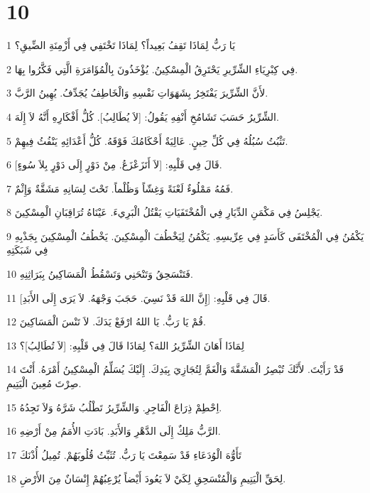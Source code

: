 \chapter{10}

\par 1 يَا رَبُّ لِمَاذَا تَقِفُ بَعِيداً؟ لِمَاذَا تَخْتَفِي فِي أَزْمِنَةِ الضِّيقِ؟
\par 2 فِي كِبْرِيَاءِ الشِّرِّيرِ يَحْتَرِقُ الْمِسْكِينُ. يُؤْخَذُونَ بِالْمُؤَامَرَةِ الَّتِي فَكَّرُوا بِهَا.
\par 3 لأَنَّ الشِّرِّيرَ يَفْتَخِرُ بِشَهَوَاتِ نَفْسِهِ وَالْخَاطِفُ يُجَدِّفُ. يُهِينُ الرَّبَّ.
\par 4 الشِّرِّيرُ حَسَبَ تَشَامُخِ أَنْفِهِ يَقُولُ: [لاَ يُطَالِبُ]. كُلُّ أَفْكَارِهِ أَنَّهُ لاَ إِلَهَ.
\par 5 تَثْبُتُ سُبُلُهُ فِي كُلِّ حِينٍ. عَالِيَةٌ أَحْكَامُكَ فَوْقَهُ. كُلُّ أَعْدَائِهِ يَنْفُثُ فِيهِمْ.
\par 6 قَالَ فِي قَلْبِهِ: [لاَ أَتَزَعْزَعُ. مِنْ دَوْرٍ إِلَى دَوْرٍ بِلاَ سُوءٍ].
\par 7 فَمُهُ مَمْلُوءٌ لَعْنَةً وَغِشّاً وَظُلْماً. تَحْتَ لِسَانِهِ مَشَقَّةٌ وَإِثْمٌ.
\par 8 يَجْلِسُ فِي مَكْمَنِ الدِّيَارِ فِي الْمُخْتَفَيَاتِ يَقْتُلُ الْبَرِيءَ. عَيْنَاهُ تُرَاقِبَانِ الْمِسْكِينَ.
\par 9 يَكْمُنُ فِي الْمُخْتَفَى كَأَسَدٍ فِي عِرِّيسِهِ. يَكْمُنُ لِيَخْطُفَ الْمِسْكِينَ. يَخْطُفُ الْمِسْكِينَ بِجَذْبِهِ فِي شَبَكَتِهِ
\par 10 فَتَنْسَحِقُ وَتَنْحَنِي وَتَسْقُطُ الْمَسَاكِينُ بِبَرَاثِنِهِ.
\par 11 قَالَ فِي قَلْبِهِ: [إِنَّ اللهَ قَدْ نَسِيَ. حَجَبَ وَجْهَهُ. لاَ يَرَى إِلَى الأَبَدِ].
\par 12 قُمْ يَا رَبُّ. يَا اللهُ ارْفَعْ يَدَكَ. لاَ تَنْسَ الْمَسَاكِينَ.
\par 13 لِمَاذَا أَهَانَ الشِّرِّيرُ اللهَ؟ لِمَاذَا قَالَ فِي قَلْبِهِ: [لاَ تُطَالِبُ]؟
\par 14 قَدْ رَأَيْتَ. لأَنَّكَ تُبْصِرُ الْمَشَقَّةَ وَالْغَمَّ لِتُجَازِيَ بِيَدِكَ. إِلَيْكَ يُسَلِّمُ الْمِسْكِينُ أَمْرَهُ. أَنْتَ صِرْتَ مُعِينَ الْيَتِيمِ.
\par 15 اِحْطِمْ ذِرَاعَ الْفَاجِرِ. وَالشِّرِّيرُ تَطْلُبُ شَرَّهُ وَلاَ تَجِدُهُ.
\par 16 الرَّبُّ مَلِكٌ إِلَى الدَّهْرِ وَالأَبَدِ. بَادَتِ الأُمَمُ مِنْ أَرْضِهِ.
\par 17 تَأَوُّهَ الْوُدَعَاءِ قَدْ سَمِعْتَ يَا رَبُّ. تُثَبِّتُ قُلُوبَهُمْ. تُمِيلُ أُذْنَكَ
\par 18 لِحَقِّ الْيَتِيمِ وَالْمُنْسَحِقِ لِكَيْ لاَ يَعُودَ أَيْضاً يُرْعِبُهُمْ إِنْسَانٌ مِنَ الأَرْضِ.

